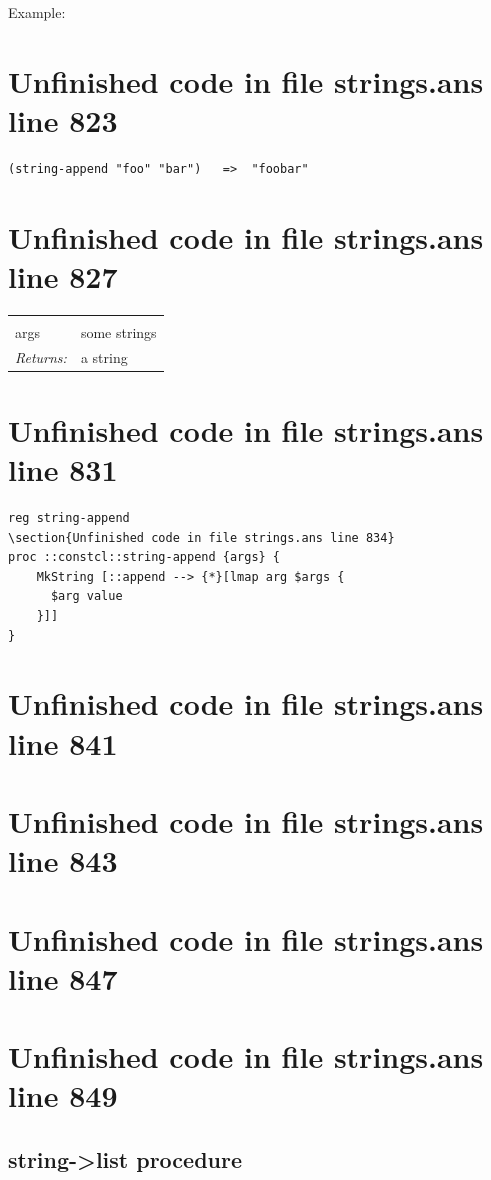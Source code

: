 \documentclass[twoside,9pt]{report}
\begin{document}
Example:

\section{Unfinished code in file strings.ans line 823}
\begin{verbatim}
(string-append "foo" "bar")   =>  "foobar"
\end{verbatim}
\section{Unfinished code in file strings.ans line 827}
\noindent\begin{tabular}{ |p{1.9cm} p{8cm}| }
\hline
\rowcolor[HTML]{CCCCCC} \multicolumn{2}{|l|}{\bf string-append (public)} \\
args & some strings \\
\textit{Returns:} & a string \\
\hline
\end{tabular}
\section{Unfinished code in file strings.ans line 831}
\begin{lstlisting}
reg string-append
\section{Unfinished code in file strings.ans line 834}
proc ::constcl::string-append {args} {
    MkString [::append --> {*}[lmap arg $args {
      $arg value
    }]]
}
\end{lstlisting}
\section{Unfinished code in file strings.ans line 841}
\section{Unfinished code in file strings.ans line 843}
\section{Unfinished code in file strings.ans line 847}
\section{Unfinished code in file strings.ans line 849}
\subsection{string->list procedure}
\label{string->list-procedure}
\end{document}
